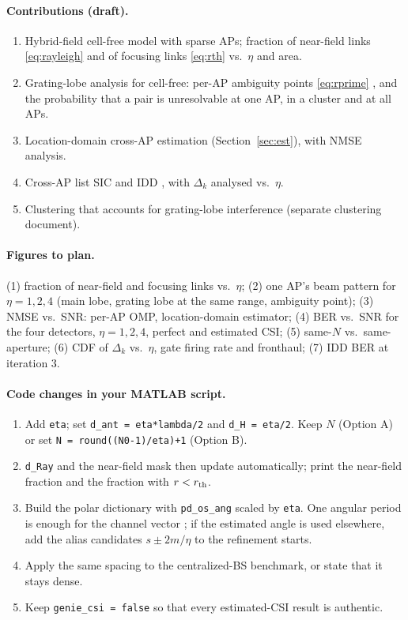 \documentclass[11pt]{article}
\begin{document}
\paragraph{Contributions (draft).}
\begin{enumerate}[label=\textbf{C\arabic*.}]
  \item Hybrid-field cell-free model with sparse APs; fraction of near-field links \eqref{eq:rayleigh} and of focusing links \eqref{eq:rth} vs.\ $\eta$ and area.
  \item Grating-lobe analysis for cell-free: per-AP ambiguity points \eqref{eq:rprime} \cite{zhou2025sparse}, and the probability that a pair is unresolvable at one AP, in a cluster and at all APs.
  \item Location-domain cross-AP estimation (Section~\ref{sec:est}), with NMSE analysis.
  \item Cross-AP list SIC and IDD \cite{haider2026icassp,haider2026vtc}, with $\Delta_k$ analysed vs.\ $\eta$.
  \item Clustering that accounts for grating-lobe interference (separate clustering document).
\end{enumerate}

\paragraph{Figures to plan.}
(1) fraction of near-field and focusing links vs.\ $\eta$;
(2) one AP's beam pattern for $\eta=1,2,4$ (main lobe, grating lobe at the same range, ambiguity point);
(3) NMSE vs.\ SNR: per-AP OMP, location-domain estimator;
(4) BER vs.\ SNR for the four detectors, $\eta=1,2,4$, perfect and estimated CSI;
(5) same-$N$ vs.\ same-aperture;
(6) CDF of $\Delta_k$ vs.\ $\eta$, gate firing rate and fronthaul;
(7) IDD BER at iteration 3.

\paragraph{Code changes in your MATLAB script.}
\begin{enumerate}
  \item Add \texttt{eta}; set \texttt{d\_ant = eta*lambda/2} and \texttt{d\_H = eta/2}. Keep $N$ (Option A) or set \texttt{N = round((N0-1)/eta)+1} (Option B).
  \item \texttt{d\_Ray} and the near-field mask then update automatically; print the near-field fraction and the fraction with $r<r_{\rm th}$.
  \item Build the polar dictionary with \texttt{pd\_os\_ang} scaled by \texttt{eta}. One angular period is enough for the channel vector \cite{chen2024nearfield}; if the estimated angle is used elsewhere, add the alias candidates $s\pm2m/\eta$ to the refinement starts.
  \item Apply the same spacing to the centralized-BS benchmark, or state that it stays dense.
  \item Keep \texttt{genie\_csi = false} so that every estimated-CSI result is authentic.
\end{enumerate}
\end{document}
